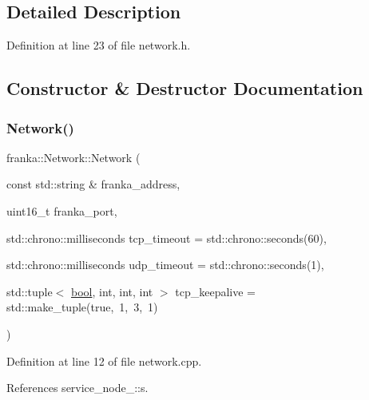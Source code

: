 \subsection{Detailed Description}


Definition at line 23 of file network.\+h.



\subsection{Constructor \& Destructor Documentation}
\mbox{\label{classfranka_1_1Network_ab4e183198d560b5093dcf2f048596001}} 
\subsubsection{\texorpdfstring{Network()}{Network()}}
{\footnotesize\ttfamily franka\+::\+Network\+::\+Network (\begin{DoxyParamCaption}\item[{const std\+::string \&}]{franka\+\_\+address,  }\item[{uint16\+\_\+t}]{franka\+\_\+port,  }\item[{std\+::chrono\+::milliseconds}]{tcp\+\_\+timeout = {\ttfamily std\+:\+:chrono\+:\+:seconds(60)},  }\item[{std\+::chrono\+::milliseconds}]{udp\+\_\+timeout = {\ttfamily std\+:\+:chrono\+:\+:seconds(1)},  }\item[{std\+::tuple$<$ \hyperlink{classbool}{bool}, int, int, int $>$}]{tcp\+\_\+keepalive = {\ttfamily std\+:\+:make\+\_\+tuple(true,~1,~3,~1)} }\end{DoxyParamCaption})}



Definition at line 12 of file network.\+cpp.



References service\+\_\+node\+\_\+::s.



